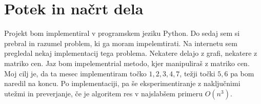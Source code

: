 \documentclass[a4paper, 12pt]{article}
\begin{document}
\section{Potek in načrt dela}
Projekt bom implementiral v programskem jeziku Python. Do sedaj sem si prebral in razumel
problem, ki ga moram impelemtirati. Na internetu sem pregledal nekaj implementacij tega 
problema. Nekatere delajo z grafi, nekatere z matriko cen. Jaz bom impelementrial metodo,
kjer manipuliraš z matriko cen.
Moj cilj je, da ta mesec implementiram točko $1,2,3,4,7$, težji točki $5,6$ pa bom naredil
na koncu.
Po implementaciji, pa še eksperimentiranje z naključnimi utežmi in preverjanje, če je
algoritem res v najslabšem primeru $O(n^3)$.
\end{document}
